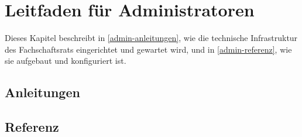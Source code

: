 \chapter{Leitfaden für Administratoren}
\label{leitfaden-admin}
Dieses Kapitel beschreibt in \autoref{admin-anleitungen}, wie die technische Infrastruktur des Fachschaftsrats eingerichtet und gewartet wird, und in \autoref{admin-referenz}, wie sie aufgebaut und konfiguriert ist.

\section{Anleitungen}
\label{admin-anleitungen}


\section{Referenz}
\label{admin-referenz}


